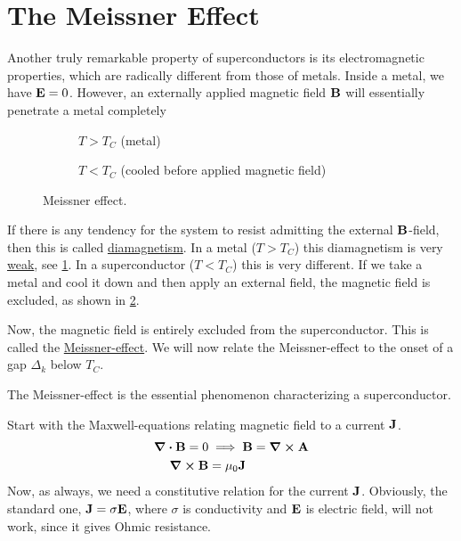 \section{The Meissner Effect}
Another truly remarkable property of superconductors is its electromagnetic properties, which are radically different from those of metals.
Inside a metal, we have $\vb E = 0$. However, an externally applied magnetic field $\vb B$ will essentially penetrate a metal completely

\begin{figure}
	\centering
	\begin{subfigure}{0.45\textwidth}
		\centering
		
		\caption{$T>T_C$ (metal)}
		\label{fig:meissn_a}
	\end{subfigure}
	\begin{subfigure}{0.45\textwidth}
		\centering
		
		\caption{$T<T_C$ (cooled before applied magnetic field)}
		\label{fig:meissn_b}
	\end{subfigure}	
	\caption{Meissner effect.}
	\label{fig:meissner_1}
\end{figure}
If there is any tendency for the system to resist admitting the external $\vb B$-field, then this is called \underline{diamagnetism}. In a metal ($T>T_C$) this diamagnetism is very \underline{weak}, see \cref{fig:meissn_a}. In a superconductor ($T<T_C$) this is very different. If we take a metal and cool it down and then apply an external field, the magnetic field is excluded, as shown in \cref{fig:meissn_b}.


Now, the magnetic field is entirely excluded from the superconductor. This is called the \underline{Meissner-effect}. 
We will now relate the Meissner-effect to the onset of a gap $\Delta_k$ below $T_C$. 
\begin{tcolorbox}
	The Meissner-effect is the essential phenomenon characterizing a superconductor.
\end{tcolorbox}
Start with the Maxwell-equations relating magnetic field to a current $\vb J$.
\begin{align}
	\div{\vb B} = 0 &\implies \vb B =\curl{\vb A} \\
	\curl{\vb B} &= \mu_0\vb J	
\end{align}
Now, as always, we need a constitutive relation for the current $\vb J$. Obviously, the standard one, $\vb J = \sigma \vb E$, where $\sigma$ is conductivity and $\vb E$ is electric field, will not work, since it gives Ohmic resistance.

